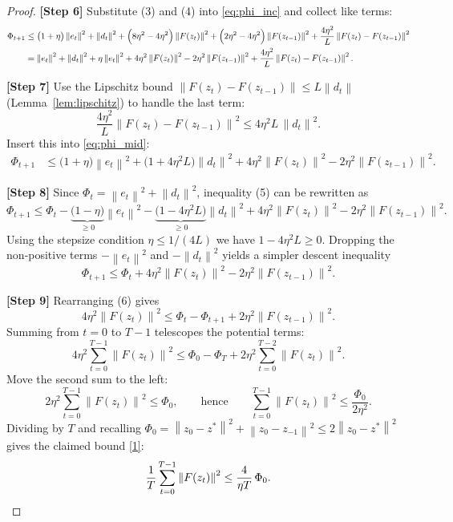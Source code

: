 \documentclass{article}
\newcommand{\norm}[1]{\left\|#1\right\|}
\begin{document}
\begin{proof}
\noindent\textbf{[Step 6]}  Substitute (3) and (4) into \eqref{eq:phi_inc} and collect like terms:
\begin{align}
\Phi_{t+1}
&\le \bigl(1+\eta\bigr)\norm{e_{t}}^{2}+\norm{d_{t}}^{2}
+\Bigl(8\eta^{2}-4\eta^{2}\Bigr)\norm{F(z_{t})}^{2}
+\Bigl(2\eta^{2}-4\eta^{2}\Bigr)\norm{F(z_{t-1})}^{2}
+\frac{4\eta^{2}}{L}\norm{F(z_{t})-F(z_{t-1})}^{2}\nonumber\\
&= \norm{e_{t}}^{2}+\norm{d_{t}}^{2}
+\eta\norm{e_{t}}^{2}
+4\eta^{2}\norm{F(z_{t})}^{2}
-2\eta^{2}\norm{F(z_{t-1})}^{2}
+\frac{4\eta^{2}}{L}\norm{F(z_{t})-F(z_{t-1})}^{2}.
\label{eq:phi_mid}
\end{align}

\noindent\textbf{[Step 7]}  Use the Lipschitz bound $\norm{F(z_{t})-F(z_{t-1})}\le L\norm{d_{t}}$ (Lemma~\ref{lem:lipschitz}) to handle the last term:
\[
\frac{4\eta^{2}}{L}\norm{F(z_{t})-F(z_{t-1})}^{2}
\le 4\eta^{2}L\,\norm{d_{t}}^{2}.
\]
Insert this into \eqref{eq:phi_mid}:
\begin{align}
\Phi_{t+1}
&\le \bigl(1+\eta\bigr)\norm{e_{t}}^{2}
+\bigl(1+4\eta^{2}L\bigr)\norm{d_{t}}^{2}
+4\eta^{2}\norm{F(z_{t})}^{2}
-2\eta^{2}\norm{F(z_{t-1})}^{2}.
\tag{5}
\end{align}

\noindent\textbf{[Step 8]}  Since $\Phi_{t}= \norm{e_{t}}^{2}+\norm{d_{t}}^{2}$, inequality (5) can be rewritten as
\[
\Phi_{t+1}\le \Phi_{t}
-\underbrace{\bigl(1-\eta\bigr)}_{\ge 0}\norm{e_{t}}^{2}
-\underbrace{\bigl(1-4\eta^{2}L\bigr)}_{\ge0}\norm{d_{t}}^{2}
+4\eta^{2}\norm{F(z_{t})}^{2}
-2\eta^{2}\norm{F(z_{t-1})}^{2}.
\]
Using the stepsize condition $\eta\le 1/(4L)$ we have $1-4\eta^{2}L\ge0$.  Dropping the non‑positive terms $-\norm{e_{t}}^{2}$ and $-\norm{d_{t}}^{2}$ yields a simpler descent inequality
\[
\Phi_{t+1}\le \Phi_{t}+4\eta^{2}\norm{F(z_{t})}^{2}-2\eta^{2}\norm{F(z_{t-1})}^{2}.
\tag{6}
\]

\noindent\textbf{[Step 9]}  Rearranging (6) gives
\[
4\eta^{2}\norm{F(z_{t})}^{2}\le \Phi_{t}-\Phi_{t+1}+2\eta^{2}\norm{F(z_{t-1})}^{2}.
\]
Summing from $t=0$ to $T-1$ telescopes the potential terms:
\[
4\eta^{2}\sum_{t=0}^{T-1}\norm{F(z_{t})}^{2}
\le \Phi_{0}-\Phi_{T}+2\eta^{2}\sum_{t=0}^{T-2}\norm{F(z_{t})}^{2}.
\]
Move the second sum to the left:
\[
2\eta^{2}\sum_{t=0}^{T-1}\norm{F(z_{t})}^{2}
\le \Phi_{0},
\qquad\text{hence}\qquad
\sum_{t=0}^{T-1}\norm{F(z_{t})}^{2}
\le \frac{\Phi_{0}}{2\eta^{2}}.
\]
Dividing by $T$ and recalling $\Phi_{0}=\norm{z_{0}-z^{*}}^{2}+\norm{z_{0}-z_{-1}}^{2}\le 2\norm{z_{0}-z^{*}}^{2}$ gives the claimed bound \eqref{1}:
\[
\frac{1}{T}\sum_{t=0}^{T-1}\norm{F(z_{t})}^{2}
\le \frac{4}{\eta T}\,\Phi_{0}.
\qedhere
\]
\end{proof}
\end{document}

